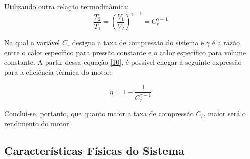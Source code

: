 \documentclass[10pt, conference, letterpaper]{IEEEtran}
\begin{document}
Utilizando outra relação termodinâmica:
\begin{equation}\label{10}
\frac{T_{\text{2}}}{T_{\text{1}}}=(\frac{V_{\text{1}}}{V_{\text{2}}})^{\gamma-1}=C_r^{\gamma-1}
\end{equation}

Na qual a variável $C_r$ designa a taxa de compressão do sistema e $\gamma$ é a razão entre o calor específico para pressão constante e o calor específico para volume constante. A partir dessa equação \ref{10}, é possível chegar à seguinte expressão para a eficiência térmica do motor:

\begin{equation}\label{11}
    \eta = 1 - \frac{1}{C_r^{\gamma - 1}}
\end{equation}\newline

Conclui-se, portanto, que quanto maior a taxa de compressão $C_r$, maior será o rendimento do motor.

\subsection{Características Físicas do Sistema}\label{intro:características-do-sistema}
\end{document}
